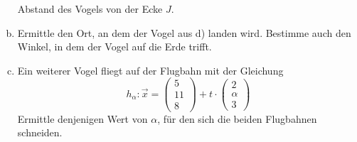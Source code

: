 \begin{exercise}
\begin{enumerate}[a)]
            Abstand des Vogels von der Ecke $J$.
      \item Ermittle den Ort, an dem der Vogel aus d) landen wird.
            Bestimme auch den Winkel, in dem der Vogel auf die Erde trifft.
      \item Ein weiterer Vogel fliegt auf der Flugbahn mit der Gleichung
            \begin{equation*}
              h_{\alpha}:\vec{x}=
              \begin{pmatrix} 5 \\ 11 \\ 8 \end{pmatrix}
              +t\cdot
              \begin{pmatrix} 2 \\ \alpha \\ 3 \end{pmatrix}
            \end{equation*}
            Ermittle denjenigen Wert von $\alpha$, für den sich die beiden
            Flugbahnen schneiden.
    \end{enumerate}
  \fi
\end{exercise}
